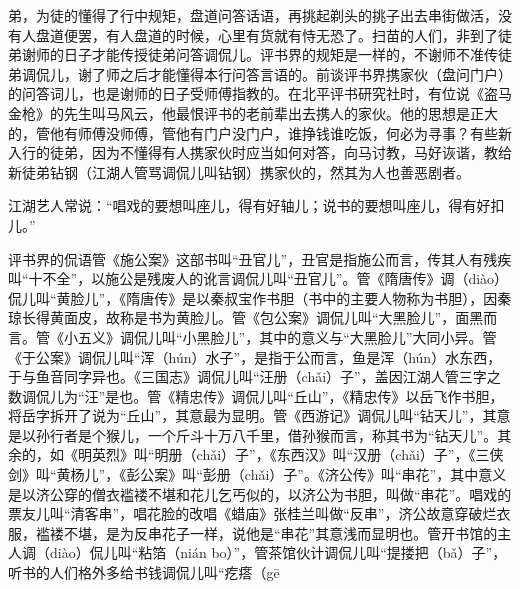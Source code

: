 \documentclass[12pt,UTF8]{ctexbook}
\begin{document}
弟，为徒的懂得了行中规矩，盘道问答话语，再挑起剃头的挑子出去串街做活，没有人盘道便罢，有人盘道的时候，心里有货就有恃无恐了。扫苗的人们，非到了徒弟谢师的日子才能传授徒弟问答调侃儿。评书界的规矩是一样的，不谢师不准传徒弟调侃儿，谢了师之后才能懂得本行问答言语的。前谈评书界携家伙（盘问门户）的问答词儿，也是谢师的日子受师傅指教的。在北平评书研究社时，有位说《盗马金枪》的先生叫马风云，他最恨评书的老前辈出去携人的家伙。他的思想是正大的，管他有师傅没师傅，管他有门户没门户，谁挣钱谁吃饭，何必为寻事？有些新入行的徒弟，因为不懂得有人携家伙时应当如何对答，向马讨教，马好诙谐，教给新徒弟钻钢（江湖人管骂调侃儿叫钻钢）携家伙的，然其为人也善恶剧者。

江湖艺人常说：“唱戏的要想叫座儿，得有好轴儿；说书的要想叫座儿，得有好扣儿。”



评书界的侃语管《施公案》这部书叫“丑官儿”，丑官是指施公而言，传其人有残疾叫“十不全”，以施公是残废人的讹言调侃儿叫“丑官儿”。管《隋唐传》调（diào）侃儿叫“黄脸儿”，《隋唐传》是以秦叔宝作书胆（书中的主要人物称为书胆），因秦琼长得黄面皮，故称是书为黄脸儿。管《包公案》调侃儿叫“大黑脸儿”，面黑而言。管《小五义》调侃儿叫“小黑脸儿”，其中的意义与“大黑脸儿”大同小异。管《于公案》调侃儿叫“浑（hún）水子”，是指于公而言，鱼是浑（hún）水东西，于与鱼音同字异也。《三国志》调侃儿叫“汪册（chǎi）子”，盖因江湖人管三字之数调侃儿为“汪”是也。管《精忠传》调侃儿叫“丘山”，《精忠传》以岳飞作书胆，将岳字拆开了说为“丘山”，其意最为显明。管《西游记》调侃儿叫“钻天儿”，其意是以孙行者是个猴儿，一个斤斗十万八千里，借孙猴而言，称其书为“钻天儿”。其余的，如《明英烈》叫“明册（chǎi）子”，《东西汉》叫“汉册（chǎi）子”，《三侠剑》叫“黄杨儿”，《彭公案》叫“彭册（chǎi）子”。《济公传》叫“串花”，其中意义是以济公穿的僧衣褴褛不堪和花儿乞丐似的，以济公为书胆，叫做“串花”。唱戏的票友儿叫“清客串”，唱花脸的改唱《蜡庙》张桂兰叫做“反串”，济公故意穿破烂衣服，褴褛不堪，是为反串花子一样，说他是“串花”其意浅而显明也。管开书馆的主人调（diào）侃儿叫“粘箔（nián bo）”，管茶馆伙计调侃儿叫“提搂把（bǎ）子”，听书的人们格外多给书钱调侃儿叫“疙瘩（gē 
\end{document}
